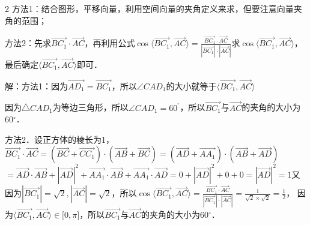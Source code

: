 \begin{multicols}{2}
\bindp [分析]方法1：结合图形，平移向量，利用空间向量的夹角定义来求，但要注意向量夹角的范围；

\bindp 方法2：先求\(\overrightarrow{BC_{1}} \cdot \overrightarrow{AC}\)，再利用公式\(\cos\langle \overrightarrow{BC_{1}},\overrightarrow{AC} \rangle = \frac{\overrightarrow{BC_{1}} \cdot \overrightarrow{AC}}{| \overrightarrow{BC_{1}} | \cdot | \overrightarrow{AC} |}\)求\(\cos\langle \overrightarrow{BC_{1}},\overrightarrow{AC} \rangle\)，最后确定\(\langle \overrightarrow{BC_{1}},\overrightarrow{AC} \rangle\)即可．

\bindp [详解]解：方法1：因为\(\overrightarrow{AD_{1}} = \overrightarrow{BC_{1}}\)，所以\(\angle CAD_{1}\)的大小就等于\(\langle \overrightarrow{BC_{1}},\overrightarrow{AC} \rangle\)

\bindp 因为△\(CAD_{1}\)为等边三角形，所以\(\angle CAD_{1} = 60^{{^\circ}}\)，所以\(\overrightarrow{BC_{1}}\)与\(\overrightarrow{AC}\)的夹角的大小为\(60{^\circ}\)．

\bindp 方法2．设正方体的棱长为1，\(\overrightarrow{BC_{1}} \cdot \overrightarrow{AC} = ( \overrightarrow{BC} + \overrightarrow{CC_{1}} ) \cdot ( \overrightarrow{AB} + \overrightarrow{BC} ) = ( \overrightarrow{AD} + \overrightarrow{AA_{1}} ) \cdot ( \overrightarrow{AB} + \overrightarrow{AD} )\)\allowbreak\(= \overrightarrow{AD} \cdot \overrightarrow{AB} + | \overrightarrow{AD} |^{2} + \overrightarrow{AA_{1}} \cdot \overrightarrow{AB} + \overrightarrow{AA_{1}} \cdot \overrightarrow{AD} = 0 + | \overrightarrow{AD} |^{2} + 0 + 0 = | \overrightarrow{AD} |^{2} = 1\)又因为\(| \overrightarrow{BC_{1}} | = \sqrt{2},| \overrightarrow{AC} | = \sqrt{2}\)，所以\(\cos\langle \overrightarrow{BC_{1}},\overrightarrow{AC} \rangle = \frac{\overrightarrow{BC_{1}} \cdot \overrightarrow{AC}}{| \overrightarrow{BC_{1}} | \cdot | \overrightarrow{AC} |} = \frac{1}{\sqrt{2} \times \sqrt{2}} = \frac{1}{2}\)，
因为\(\langle \overrightarrow{BC_{1}},\overrightarrow{AC} \rangle \in \lbrack 0,\pi\rbrack\)，所以\(\overrightarrow{BC_{1}}\)与\(\overrightarrow{AC}\)的夹角的大小为\(60{^\circ}\)．





\end{multicols}
